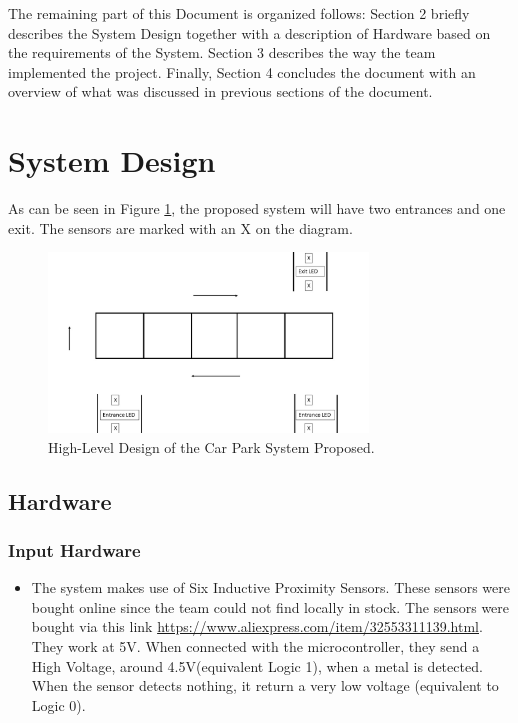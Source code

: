 \documentclass[11pt,a4paper,twocolumn]{article}
\begin{document}
The remaining part of this Document is organized follows: Section 2 briefly describes the System Design together with a description of Hardware based on the requirements of the System. Section 3 describes the way the team implemented the project. Finally, Section 4 concludes the document with an overview of what was discussed in previous sections of the document. 

\section{System Design}

As can be seen in Figure \ref{fig:plot1}, the proposed system will have two entrances and one exit. The sensors are marked with an X on the diagram. 
 \begin{figure}
	\centering
	\includegraphics[width=85mm]{Car_Park}
	\caption{High-Level Design of the Car Park System Proposed.}
	\label{fig:plot1}
	\centering
\end{figure}

\subsection{Hardware}

\subsubsection{Input Hardware}

\begin{itemize}
\item The system makes use of Six Inductive Proximity Sensors. These sensors were bought online since the team could not find locally in stock. The sensors were bought via this link \url{https://www.aliexpress.com/item/32553311139.html}. They work at 5V. When connected with the microcontroller, they send a High Voltage, around 4.5V(equivalent Logic 1), when a metal is detected. When the sensor detects nothing, it return a very low voltage (equivalent to Logic 0).   

\end{itemize}
\end{document}
